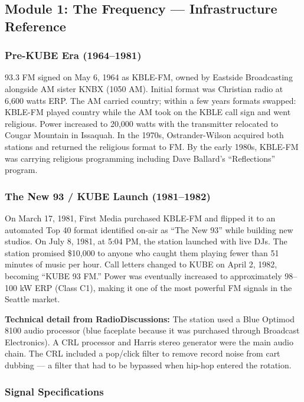 \documentclass[11pt,letterpaper]{article}
\begin{document}
\subsection{Module 1: The Frequency --- Infrastructure Reference}

\subsubsection{Pre-KUBE Era (1964--1981)}
93.3 FM signed on May 6, 1964 as KBLE-FM, owned by Eastside Broadcasting alongside AM sister KNBX (1050 AM). Initial format was Christian radio at 6,600 watts ERP. The AM carried country; within a few years formats swapped: KBLE-FM played country while the AM took on the KBLE call sign and went religious. Power increased to 20,000 watts with the transmitter relocated to Cougar Mountain in Issaquah. In the 1970s, Ostrander-Wilson acquired both stations and returned the religious format to FM. By the early 1980s, KBLE-FM was carrying religious programming including Dave Ballard's ``Reflections'' program.

\subsubsection{The New 93 / KUBE Launch (1981--1982)}
On March 17, 1981, First Media purchased KBLE-FM and flipped it to an automated Top 40 format identified on-air as ``The New 93'' while building new studios. On July 8, 1981, at 5:04 PM, the station launched with live DJs. The station promised \$10,000 to anyone who caught them playing fewer than 51 minutes of music per hour. Call letters changed to KUBE on April 2, 1982, becoming ``KUBE 93 FM.'' Power was eventually increased to approximately 98--100 kW ERP (Class C1), making it one of the most powerful FM signals in the Seattle market.

\textbf{Technical detail from RadioDiscussions:} The station used a Blue Optimod 8100 audio processor (blue faceplate because it was purchased through Broadcast Electronics). A CRL processor and Harris stereo generator were the main audio chain. The CRL included a pop/click filter to remove record noise from cart dubbing --- a filter that had to be bypassed when hip-hop entered the rotation.

\subsubsection{Signal Specifications}
\end{document}
